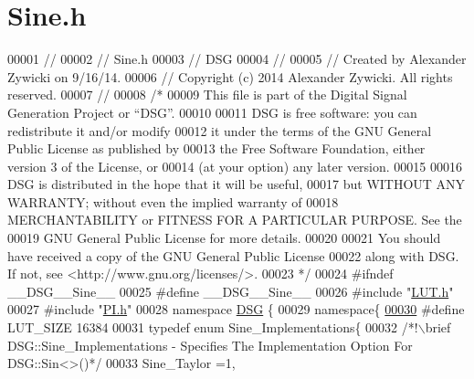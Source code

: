 \hypertarget{_sine_8h_source}{\section{Sine.\+h}
\label{_sine_8h_source}
}

\begin{DoxyCode}
00001 \textcolor{comment}{//}
00002 \textcolor{comment}{//  Sine.h}
00003 \textcolor{comment}{//  DSG}
00004 \textcolor{comment}{//}
00005 \textcolor{comment}{//  Created by Alexander Zywicki on 9/16/14.}
00006 \textcolor{comment}{//  Copyright (c) 2014 Alexander Zywicki. All rights reserved.}
00007 \textcolor{comment}{//}
00008 \textcolor{comment}{/*}
00009 \textcolor{comment}{ This file is part of the Digital Signal Generation Project or “DSG”.}
00010 \textcolor{comment}{}
00011 \textcolor{comment}{ DSG is free software: you can redistribute it and/or modify}
00012 \textcolor{comment}{ it under the terms of the GNU General Public License as published by}
00013 \textcolor{comment}{ the Free Software Foundation, either version 3 of the License, or}
00014 \textcolor{comment}{ (at your option) any later version.}
00015 \textcolor{comment}{}
00016 \textcolor{comment}{ DSG is distributed in the hope that it will be useful,}
00017 \textcolor{comment}{ but WITHOUT ANY WARRANTY; without even the implied warranty of}
00018 \textcolor{comment}{ MERCHANTABILITY or FITNESS FOR A PARTICULAR PURPOSE.  See the}
00019 \textcolor{comment}{ GNU General Public License for more details.}
00020 \textcolor{comment}{}
00021 \textcolor{comment}{ You should have received a copy of the GNU General Public License}
00022 \textcolor{comment}{ along with DSG.  If not, see <http://www.gnu.org/licenses/>.}
00023 \textcolor{comment}{ */}
00024 \textcolor{preprocessor}{#ifndef \_\_DSG\_\_Sine\_\_}
00025 \textcolor{preprocessor}{#define \_\_DSG\_\_Sine\_\_}
00026 \textcolor{preprocessor}{#include "\hyperlink{_l_u_t_8h}{LUT.h}"}
00027 \textcolor{preprocessor}{#include "\hyperlink{_p_i_8h}{PI.h}"}
00028 \textcolor{keyword}{namespace }\hyperlink{namespace_d_s_g}{DSG} \{
00029     \textcolor{keyword}{namespace}\{
\hypertarget{_sine_8h_source_l00030}{}\hyperlink{_sine_8h_aebfcb45923a56e8581fda080243ec5bb}{00030} \textcolor{preprocessor}{            #define LUT\_SIZE 16384}
00031         \textcolor{keyword}{typedef} \textcolor{keyword}{enum} Sine\_Implementations\{\textcolor{comment}{}
00032 \textcolor{comment}{            /*!\(\backslash\)brief DSG::Sine\_Implementations - Specifies The Implementation Option For DSG::Sin<>()*/}
00033             Sine\_Taylor =1,

\end{DoxyCode}

